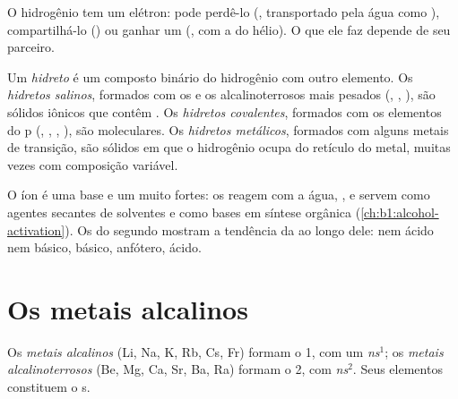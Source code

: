 O hidrogênio tem um elétron: pode perdê-lo (, transportado pela
água como ), compartilhá-lo () ou ganhar um
(, com a  do hélio). O que ele faz depende
de seu parceiro.

\begin{definition}[Hidretos]\label{def:b1:s-block:hydride}
Um \emph{hidreto} é um composto binário do hidrogênio com
outro elemento. Os \emph{hidretos salinos}, formados
com os  e os alcalinoterrosos mais pesados (,
, ), são sólidos iônicos que contêm . Os \emph{hidretos
covalentes}, formados com os elementos do  p
(, , , ), são moleculares. Os \emph{hidretos
metálicos}, formados com alguns metais de transição,
são sólidos em que o hidrogênio ocupa  do retículo
do metal, muitas vezes com composição variável.
\end{definition}

O íon  é uma base e um  muito fortes: os 
reagem com a água, , e servem como agentes
secantes de solventes e como bases em síntese orgânica (\cref{ch:b1:alcohol-activation}).
Os  do segundo  mostram a tendência da
 ao longo dele:  nem ácido nem básico, 
básico,  anfótero,  ácido.

\section{Os metais alcalinos}

\begin{definition}\label{def:b1:s-block:families}
Os \emph{metais alcalinos} (Li, Na, K, Rb, Cs, Fr)
formam o  1, com um  \textit{ns}$^1$; os
\emph{metais alcalinoterrosos} (Be, Mg, Ca, Sr,
Ba, Ra) formam o  2, com \textit{ns}$^2$. Seus elementos constituem
o  s.
\end{definition}

